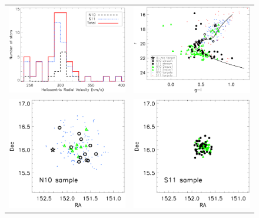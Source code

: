 \documentclass{emulateapj}
\begin{document}
\begin{figure}
 \begin{center}
  \begin{tabular}{cc}
    \includegraphics[width=8.5cm]{velhist.ps} & \includegraphics[width=8.5cm]{cm_2.ps} \\
    \includegraphics[width=8.5cm]{coord1.ps}  & \includegraphics[width=8.5cm]{coord2.ps}  \\

\end{tabular}
\end{center}
\end{figure}
\end{document}
